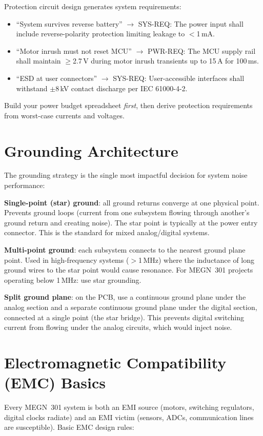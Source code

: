 \begin{keyconceptbox}
Protection circuit design generates system requirements:
\begin{itemize}[nosep,leftmargin=1.5em]
\item ``System survives reverse battery'' $\to$ SYS-REQ: The power input shall include reverse-polarity protection limiting leakage to $<$1\,mA.
\item ``Motor inrush must not reset MCU'' $\to$ PWR-REQ: The MCU supply rail shall maintain $\geq$2.7\,V during motor inrush transients up to 15\,A for 100\,ms.
\item ``ESD at user connectors'' $\to$ SYS-REQ: User-accessible interfaces shall withstand $\pm$8\,kV contact discharge per IEC 61000-4-2.
\end{itemize}
Build your power budget spreadsheet \emph{first}, then derive protection requirements from worst-case currents and voltages.
\end{keyconceptbox}


\section{Grounding Architecture}
The grounding strategy is the single most impactful decision for system noise performance:

\textbf{Single-point (star) ground}: all ground returns converge at one physical point. Prevents ground loops (current from one subsystem flowing through another's ground return and creating noise). The star point is typically at the power entry connector. This is the standard for mixed analog/digital systems.

\textbf{Multi-point ground}: each subsystem connects to the nearest ground plane point. Used in high-frequency systems ($>$1\,MHz) where the inductance of long ground wires to the star point would cause resonance. For MEGN~301 projects operating below 1\,MHz: use star grounding.

\textbf{Split ground plane}: on the PCB, use a continuous ground plane under the analog section and a separate continuous ground plane under the digital section, connected at a single point (the star bridge). This prevents digital switching current from flowing under the analog circuits, which would inject noise.

\section{Electromagnetic Compatibility (EMC) Basics}
Every MEGN~301 system is both an EMI source (motors, switching regulators, digital clocks radiate) and an EMI victim (sensors, ADCs, communication lines are susceptible). Basic EMC design rules:

